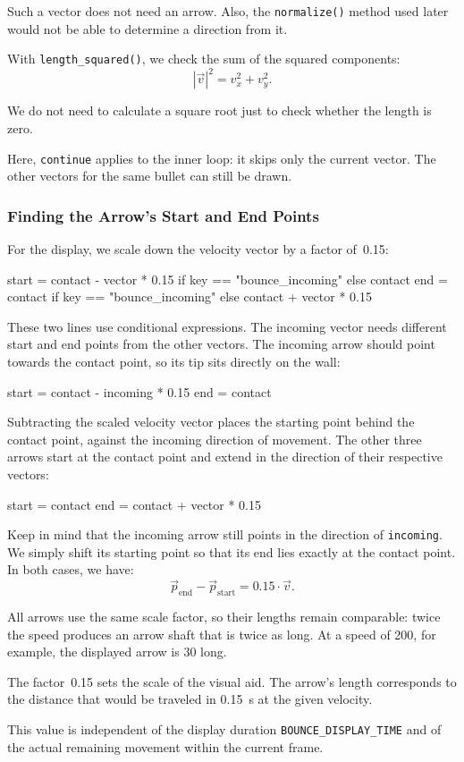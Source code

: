 Such a vector does not need an arrow. Also, the \texttt{normalize()} method used later would not be able to determine a direction from it.

With \texttt{length\_squared()}, we check the sum of the squared components:
\[
|\vec v|^2 = v_x^2 + v_y^2.
\]

We do not need to calculate a square root just to check whether the length is zero.

Here, \texttt{continue} applies to the inner loop: it skips only the current vector. The other vectors for the same bullet can still be drawn.

\subsubsection*{Finding the Arrow's Start and End Points}

For the display, we scale down the velocity vector by a factor of~0.15:
\begin{codebox}
start = contact - vector * 0.15 if key == "bounce_incoming" else contact
end = contact if key == "bounce_incoming" else contact + vector * 0.15
\end{codebox}

These two lines use conditional expressions. The incoming vector needs different start and end points from the other vectors. The incoming arrow should point towards the contact point, so its tip sits directly on the wall:
\begin{codebox}
start = contact - incoming * 0.15
end = contact
\end{codebox}

Subtracting the scaled velocity vector places the starting point behind the contact point, against the incoming direction of movement. The other three arrows start at the contact point and extend in the direction of their respective vectors:
\begin{codebox}
start = contact
end = contact + vector * 0.15
\end{codebox}

Keep in mind that the incoming arrow still points in the direction of \texttt{incoming}. We simply shift its starting point so that its end lies exactly at the contact point. In both cases, we have:
\[
\vec p_{\mathrm{end}}
-
\vec p_{\mathrm{start}}
=
0.15 \cdot \vec v.
\]

All arrows use the same scale factor, so their lengths remain comparable: twice the speed produces an arrow shaft that is twice as long. At a speed of \SI{200}{\pxsec}, for example, the displayed arrow is \SI{30}{\pixel} long.
\begin{hintbox}
	The factor~0.15 sets the scale of the visual aid. The arrow's length corresponds to the distance that would be traveled in \SI{0.15}{\second} at the given velocity.
	
	This value is independent of the display duration \texttt{BOUNCE\_DISPLAY\_TIME} and of the actual remaining movement within the current frame.
\end{hintbox}


